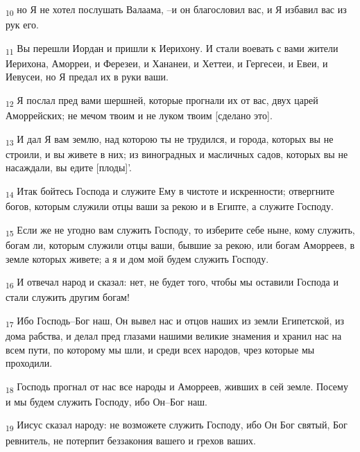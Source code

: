 \begin{tcolorbox}
\textsubscript{10} но Я не хотел послушать Валаама, --и он благословил вас, и Я избавил вас из рук его.
\end{tcolorbox}
\begin{tcolorbox}
\textsubscript{11} Вы перешли Иордан и пришли к Иерихону. И стали воевать с вами жители Иерихона, Аморреи, и Ферезеи, и Хананеи, и Хеттеи, и Гергесеи, и Евеи, и Иевусеи, но Я предал их в руки ваши.
\end{tcolorbox}
\begin{tcolorbox}
\textsubscript{12} Я послал пред вами шершней, которые прогнали их от вас, двух царей Аморрейских; не мечом твоим и не луком твоим [сделано это].
\end{tcolorbox}
\begin{tcolorbox}
\textsubscript{13} И дал Я вам землю, над которою ты не трудился, и города, которых вы не строили, и вы живете в них; из виноградных и масличных садов, которых вы не насаждали, вы едите [плоды]'.
\end{tcolorbox}
\begin{tcolorbox}
\textsubscript{14} Итак бойтесь Господа и служите Ему в чистоте и искренности; отвергните богов, которым служили отцы ваши за рекою и в Египте, а служите Господу.
\end{tcolorbox}
\begin{tcolorbox}
\textsubscript{15} Если же не угодно вам служить Господу, то изберите себе ныне, кому служить, богам ли, которым служили отцы ваши, бывшие за рекою, или богам Аморреев, в земле которых живете; а я и дом мой будем служить Господу.
\end{tcolorbox}
\begin{tcolorbox}
\textsubscript{16} И отвечал народ и сказал: нет, не будет того, чтобы мы оставили Господа и стали служить другим богам!
\end{tcolorbox}
\begin{tcolorbox}
\textsubscript{17} Ибо Господь--Бог наш, Он вывел нас и отцов наших из земли Египетской, из дома рабства, и делал пред глазами нашими великие знамения и хранил нас на всем пути, по которому мы шли, и среди всех народов, чрез которые мы проходили.
\end{tcolorbox}
\begin{tcolorbox}
\textsubscript{18} Господь прогнал от нас все народы и Аморреев, живших в сей земле. Посему и мы будем служить Господу, ибо Он--Бог наш.
\end{tcolorbox}
\begin{tcolorbox}
\textsubscript{19} Иисус сказал народу: не возможете служить Господу, ибо Он Бог святый, Бог ревнитель, не потерпит беззакония вашего и грехов ваших.
\end{tcolorbox}
